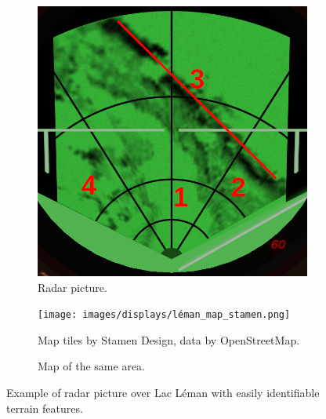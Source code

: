 \begin{figure}[!ht]
  \centering
  \begin{subfigure}[t]{0.49\textwidth}
    \includegraphics[width=\textwidth]{images/displays/CI-radar.png}
    \caption{Radar picture.}
  \end{subfigure}
  \begin{subfigure}[t]{0.49\textwidth}
    \texttt{[image: images/displays/léman\_map\_stamen.png]}
    \caption{Map of the same area.}

    {\centering \footnotesize Map tiles by Stamen Design, data by OpenStreetMap.}
  \end{subfigure}

  \caption{%
    Example of radar picture over Lac Léman with easily identifiable terrain features.
  }
  \label{fig:CI-radar}
\end{figure}
